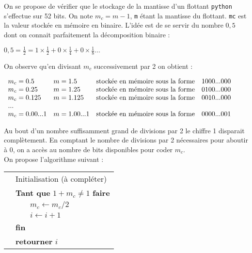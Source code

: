 
On se propose de vérifier que le stockage de la mantisse d'un flottant \texttt{python} s'effectue sur 52 bits.
On note $m_c=m-1$, \texttt{m} étant la mantisse du flottant. \texttt{mc} est la valeur stockée en mémoire en binaire.
L'idée est de se servir du nombre $0,5$ dont on connait parfaitement la décomposition binaire :

\begin{center}
$0,5=\frac{1}{2}=1 \times \frac{1}{2} + 0 \times \frac{1}{4} + 0 \times \frac{1}{8}... $
\end{center}

On observe qu'en divisant $m_c$ successivement par 2 on obtient :
\begin{center}
$
\begin{array}{l l l l}
m_c=0.5 & m=1.5 & \mbox{stockée en mémoire sous la forme} & 1000...000\\
m_c=0.25 & m=1.25 & \mbox{stockée en mémoire sous la forme} & 0100...000\\
m_c=0.125 & m=1.125 & \mbox{stockée en mémoire sous la forme} & 0010...000\\
...\\
m_c=0.00...1 & m=1.00...1 & \mbox{stockée en mémoire sous la forme} & 0000...001\\
\end{array}
$
\end{center}

Au bout d'un nombre suffisamment grand de divisions par 2 le chiffre 1 disparait complètement. En comptant le nombre de divisions par 2 nécessaires pour aboutir à 0, on a accès au nombre de bits disponibles pour coder $m_c$.\\
On propose l'algorithme suivant :

\begin{tabular}{p{1cm}|p{1cm}|p{5cm}}
& \multicolumn{2}{l}{Initialisation (à compléter)} \\
& \multicolumn{2}{l}{\textbf{Tant que} $1+m_c \neq 1$ \textbf{faire}} \\
&& $m_c \leftarrow m_c/2 $\\
&& $i \leftarrow i+1 $\\
& \multicolumn{2}{l}{\textbf{fin}} \\
& \multicolumn{2}{l}{\textbf{retourner } $i$} \\
\end{tabular}




